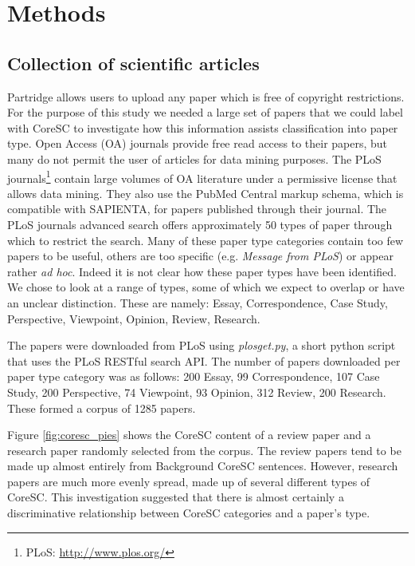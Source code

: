 \documentclass{svmult}
\begin{document}
\vspace{-15pt}
\section{Methods}
\label{sec:2}

\subsection*{Collection of scientific articles} Partridge allows users to
upload any paper which is free of copyright restrictions.  For the purpose of
this study we needed a large set of papers that we could label with CoreSC to
investigate how this information assists classification into paper type.  Open
Access (OA) journals provide free read access to their papers, but many do not
permit the user of articles for data mining purposes. The PLoS
journals\footnote{PLoS: \url{http://www.plos.org/}} contain large volumes of OA
literature under a permissive license that allows data mining.  They also use
the PubMed Central markup schema, which is compatible with SAPIENTA, for papers
published through their journal. The PLoS journals advanced search offers
approximately 50 types of paper through which to restrict the search.  Many of
these paper type categories contain too few papers to be useful, others are too
specific (e.g. {\it Message from PLoS}) or appear rather {\it ad hoc}. Indeed it is not
clear how these paper types have been identified. We chose to look at a range
of types, some of which we expect to overlap or have an unclear distinction.
These are namely: Essay, Correspondence, Case Study, Perspective,
Viewpoint, Opinion, Review, Research. 

The papers were downloaded from PLoS using {\em plosget.py}, a short
python script that uses the PLoS RESTful search API. The number of
papers downloaded per paper type category was as follows: 200 Essay,
99 Correspondence, 107 Case Study, 200 Perspective, 74 Viewpoint, 93
Opinion, 312 Review, 200 Research.  These formed a corpus of 1285 %
papers.

Figure \ref{fig:coresc_pies} shows the CoreSC content of a review paper and a
research paper randomly selected from the corpus.  The review papers tend to be
made up almost entirely from Background CoreSC sentences.  However, research
papers are much more evenly spread, made up of several different types of
CoreSC.  This investigation suggested that there is almost certainly a
discriminative relationship between CoreSC categories and a paper's type. 
\end{document}
